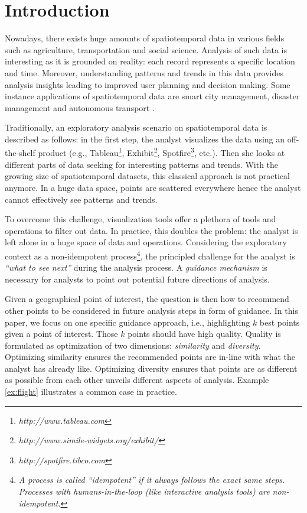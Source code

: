 \section{Introduction} 
Nowadays, there exists huge amounts of spatiotemporal data in various fields such as agriculture, transportation and social science. Analysis of such data is interesting as it is grounded
on reality: each record represents a specific location and time. Moreover, understanding patterns and trends in this data provides analysis insights leading to improved user planning and decision making. Some instance applications of spatiotemporal data are smart city management, disaster management and autonomous transport \cite{RoddickEHPS04,Telang:2012}.

Traditionally, an exploratory analysis scenario on spatiotemporal data is described as follows: in the first step, the analyst visualizes the data using an off-the-shelf product (e.g., Tableau\footnote{\it http://www.tableau.com}, Exhibit\footnote{\it http://www.simile-widgets.org/exhibit/}, Spotfire\footnote{\it http://spotfire.tibco.com}, etc.). Then she looks at different parts of data seeking for interesting patterns and trends. With the growing size of spatiotemporal datasets, this classical approach is not practical anymore. In a huge data space, points are scattered everywhere hence the analyst cannot effectively see patterns and trends.

To overcome this challenge, visualization tools offer a plethora of tools and operations to filter out data. In practice, this doubles the problem: the analyst is left alone in a huge space of data and operations. Considering the exploratory context as a non-idempotent process\footnote{\it A process is called ``idempotent'' if it always follows the exact same steps. Processes with humans-in-the-loop (like interactive analysis tools) are non-idempotent.}, the principled challenge for the analyst is {\em ``what to see next''} during the analysis process. A {\em guidance mechanism} is necessary for analysts to point out potential future directions of analysis.

Given a geographical point of interest, the question is then how to recommend other points to be considered in future analysis steps in form of guidance. In this paper, we focus on one specific guidance approach, i.e., highlighting $k$ best points given a point of interest. Those $k$ points should have high quality. Quality is formulated as optimization of two dimensions: {\em similarity} and {\em diversity}. Optimizing similarity ensures the recommended points are in-line with what the analyst has already like. Optimizing diversity ensures that points are as different as possible from each other unveils different aspects of analysis. Example \ref{ex:flight} illustrates a common case in practice.

